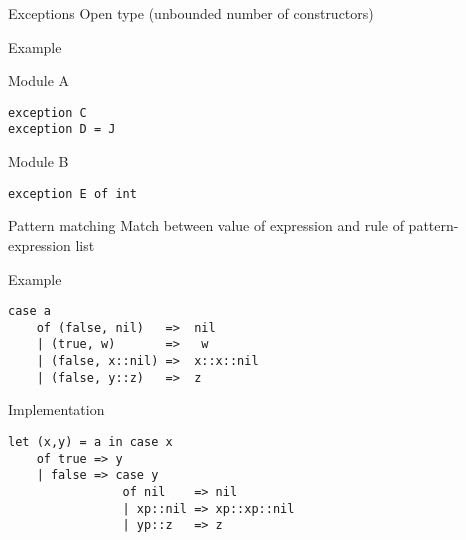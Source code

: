 \documentclass[presentation]{beamer}
\begin{document}
\begin{frame}[fragile]{Exceptions}
Open type (unbounded number of constructors)
  \begin{block}{Example}
    \begin{block}{Module A}
\begin{verbatim}
exception C
exception D = J
\end{verbatim}
    \end{block}
    \begin{block}{Module B}
\begin{verbatim}
exception E of int
\end{verbatim}
    \end{block}
  \end{block}
\end{frame}

\begin{frame}[fragile,label={sec:orgheadline6}]{Pattern matching}
Match between value of expression and rule of pattern-expression list
  \begin{block}{Example}
\begin{verbatim}
case a
    of (false, nil)   =>  nil
    | (true, w)       =>   w
    | (false, x::nil) =>  x::x::nil
    | (false, y::z)   =>  z
\end{verbatim}
  \end{block}
  \begin{block}{Implementation}
\begin{verbatim}
let (x,y) = a in case x
    of true => y
    | false => case y
                of nil    => nil
                | xp::nil => xp::xp::nil
                | yp::z   => z
\end{verbatim}
  \end{block}
\end{frame}
\end{document}
